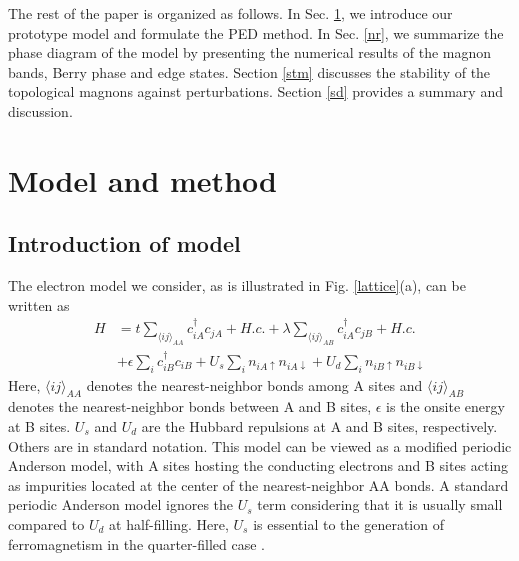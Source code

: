 \documentclass[amsmath,superscriptaddress,showpacs,aps,prb,twocolumn]{revtex4-1}
\begin{document}
\par The rest of the paper is organized as follows. In Sec. \ref{mm}, we introduce our prototype model and formulate the PED method. In Sec. \ref{nr}, we summarize the phase diagram of the model by presenting the numerical results of the magnon bands, Berry phase and edge states. Section \ref{stm} discusses the stability of the topological magnons against perturbations. Section \ref{sd} provides a summary and discussion.

\section{Model and method}\label{mm}
\subsection{Introduction of model}
\par The electron model we consider, as is illustrated in Fig. \ref{lattice}(a), can be written as
\begin{equation}\label{model}
\begin{aligned}
    H   &   =t\sum_{\langle ij\rangle_{AA}}c_{iA}^\dagger c_{jA}+H.c.+ \lambda\sum_{\langle ij\rangle_{AB}}c_{iA}^\dagger c_{jB}+H.c.\\
        &   +\epsilon\sum_i c^\dagger_{iB}c_{iB}+U_s\sum_i n_{iA\uparrow}n_{iA\downarrow}+U_d\sum_in_{iB\uparrow}n_{iB\downarrow}
\end{aligned}
\end{equation}
Here, $\langle ij\rangle_{AA}$ denotes the nearest-neighbor bonds among A sites and $\langle ij\rangle_{AB}$ denotes the nearest-neighbor bonds between A and B sites, $\epsilon$ is the onsite energy at B sites. $U_s$ and $U_d$ are the Hubbard repulsions at A and B sites, respectively. Others are in standard notation. This model can be viewed as a modified periodic Anderson model, with A sites hosting the conducting electrons and B sites acting as impurities located at the center of the nearest-neighbor AA bonds. A standard periodic Anderson model ignores the $U_s$ term considering that it is usually small compared to $U_d$ at half-filling. Here, $U_s$ is essential to the generation of ferromagnetism in the quarter-filled case \cite{T_PRL1992}.
\end{document}
